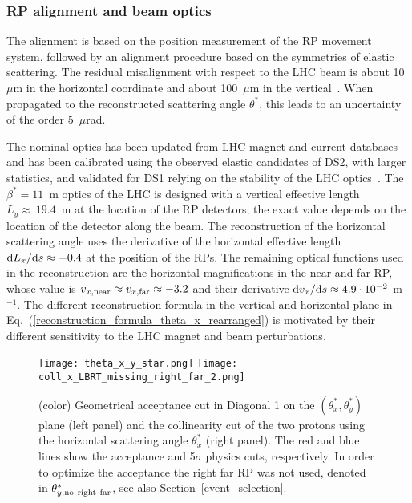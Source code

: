 \documentclass[TOTEM]{cernphprep}
\begin{document}
	\subsubsection{RP alignment and beam optics}
	\label{RP_alignment}

	The alignment is based on the position measurement of the RP movement system, followed by an alignment procedure based on the symmetries of elastic scattering. The residual misalignment with respect to the LHC beam is about
	10~$\mu$m in the horizontal coordinate and about 100~$\mu$m in the vertical~\cite{Antchev:2016vpy,Antchev:2015zza}. When propagated to the reconstructed scattering angle $\theta^{*}$, this leads to an uncertainty of
	the order 5~$\mu$rad.

	The nominal optics has been updated from LHC magnet and current databases and has been calibrated using the observed elastic candidates of DS2, with larger statistics, and validated for
	DS1 relying on the stability of the LHC optics~\cite{Bruning:2004ej,Nemes:2017gut}.  The $\beta^{*}=11$~m optics of the LHC is designed with a vertical effective length $L_{y}\approx~19.4$~m at the location of the RP detectors;
	the exact value depends on the location of the detector along the beam. The reconstruction
		of the horizontal scattering angle uses the derivative of the horizontal effective length ${{\rm d}L_{x}}/{{\rm d}s}\approx-0.4$ at the position of the RPs. The remaining optical functions used
		in the reconstruction are the horizontal magnifications in the near and far RP, whose value is $v_{x, {\rm near}} \approx v_{x, {\rm far}}\approx-3.2$ and their derivative ${{\rm d}v_{x}}/{{\rm d}s}\approx 4.9\cdot10^{-2}~$m$^{-1}$. The different reconstruction formula in the vertical
		and horizontal plane in Eq.~(\ref{reconstruction_formula_theta_x_rearranged}) is motivated by their different sensitivity to the LHC magnet and beam perturbations.

	\begin{figure}[H]
		\centering
		\texttt{[image: theta\_x\_y\_star.png]}
		\texttt{[image: coll\_x\_LBRT\_missing\_right\_far\_2.png]}
		\caption{(color) Geometrical acceptance cut in Diagonal 1 on the $(\theta_{x}^{*},\theta_{y}^{*})$ plane (left panel) and the collinearity cut of the two protons using the
		horizontal scattering angle $\theta_{x}^{*}$ (right panel). The red and blue lines show the acceptance and 5$\sigma$ physics cuts, respectively. In order to optimize the
		acceptance the right far RP was not used, denoted in $\theta^{*}_{y,\rm no~right~far}$, see also Section~\ref{event_selection}.}
		\label{cuts}
 	\end{figure}
\end{document}
